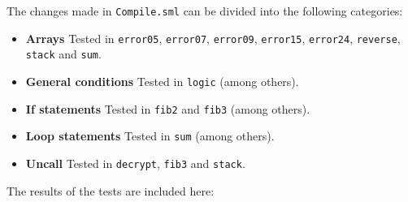 \vspace{0.2cm}
The changes made in {\tt Compile.sml} can be divided into the following categories:
\begin{itemize}
\item {\bf Arrays} Tested in {\tt error05}, {\tt error07}, {\tt error09},
      {\tt error15}, {\tt error24}, {\tt reverse}, {\tt stack} and {\tt sum}.
\item {\bf General conditions} Tested in {\tt logic} (among others).
\item {\bf If statements} Tested in {\tt fib2} and {\tt fib3} (among others).
\item {\bf Loop statements} Tested in {\tt sum} (among others).
\item {\bf Uncall} Tested in {\tt decrypt}, {\tt fib3} and {\tt stack}.
\end{itemize}

\clearpage
The results of the tests are included here:
{\tiny \tt

}
